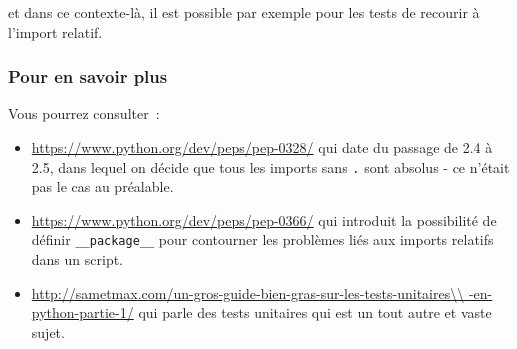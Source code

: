 et dans ce contexte-là, il est possible par exemple pour les tests de
recourir à l'import relatif.

    \hypertarget{pour-en-savoir-plus}{%
\subsubsection{Pour en savoir plus}\label{pour-en-savoir-plus}}

    Vous pourrez consulter~:
    
\begin{itemize}
	\item 
	\url{https://www.python.org/dev/peps/pep-0328/} qui date du passage de
	2.4 à 2.5, dans lequel on décide que tous les imports sans \texttt{.}
	sont absolus - ce n'était pas le cas au préalable.
	\item
	\url{https://www.python.org/dev/peps/pep-0366/} qui introduit la
	possibilité de définir \texttt{\_\_package\_\_} pour contourner les
	problèmes liés aux imports relatifs dans un script.
	\item
	\url{http://sametmax.com/un-gros-guide-bien-gras-sur-les-tests-unitaires\\
		-en-python-partie-1/}
	qui parle des tests unitaires qui est un tout autre et vaste sujet.
\end{itemize}